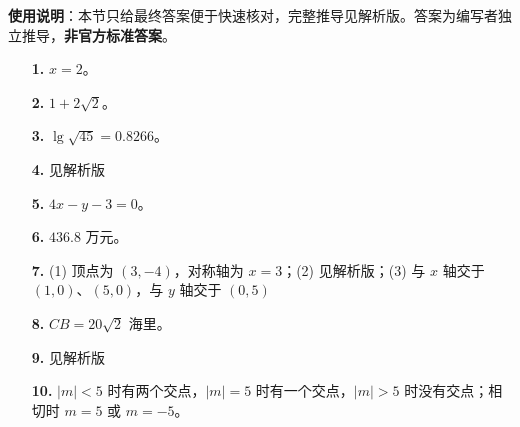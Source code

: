 
\begin{gknotice}
\textbf{使用说明}：本节只给最终答案便于快速核对，完整推导见解析版。答案为编写者独立推导，\textbf{非官方标准答案}。
\end{gknotice}

\begin{itemize}[leftmargin=2.6em]
  \item[\textbf{1.}] $x=2$。
  \item[\textbf{2.}] $1+2\sqrt2$。
  \item[\textbf{3.}] $\lg\sqrt{45}=0.8266$。
  \item[\textbf{4.}] 见解析版
  \item[\textbf{5.}] $4x-y-3=0$。
  \item[\textbf{6.}] $436.8$ 万元。
  \item[\textbf{7.}] (1) 顶点为 $(3,-4)$，对称轴为 $x=3$；(2) 见解析版；(3) 与 $x$ 轴交于 $(1,0)$、$(5,0)$，与 $y$ 轴交于 $(0,5)$
  \item[\textbf{8.}] $CB=20\sqrt2$ 海里。
  \item[\textbf{9.}] 见解析版
  \item[\textbf{10.}] $|m|<5$ 时有两个交点，$|m|=5$ 时有一个交点，$|m|>5$ 时没有交点；相切时 $m=5$ 或 $m=-5$。
\end{itemize}
